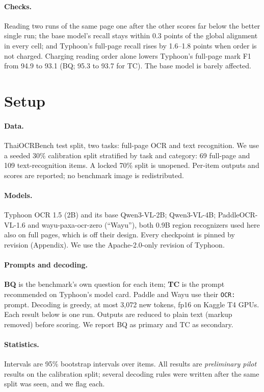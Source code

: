 \documentclass[10pt,twocolumn]{article}
\newcommand{\code}[1]{\texttt{#1}}
\begin{document}
\paragraph{Checks.} Reading two runs of the same page one after the other scores far below the better single run; the base model's recall stays within 0.3 points of the global alignment in every cell; and Typhoon's full-page recall rises by 1.6--1.8 points when order is not charged. Charging reading order alone lowers Typhoon's full-page mark F1 from 94.9 to 93.1 (BQ; 95.3 to 93.7 for TC). The base model is barely affected.

\section{Setup}\label{sec:setup}
\paragraph{Data.} ThaiOCRBench \citep{nonesung2025thaiocrbench} test split, two tasks: full-page OCR and text recognition. We use a seeded 30\% calibration split stratified by task and category: 69 full-page and 109 text-recognition items. A locked 70\% split is unopened. Per-item outputs and scores are reported; no benchmark image is redistributed.

\paragraph{Models.} Typhoon OCR 1.5 (2B) and its base Qwen3-VL-2B; Qwen3-VL-4B; PaddleOCR-VL-1.6 and wayu-paxa-ocr-zero (``Wayu''), both 0.9B region recognizers used here also on full pages, which is off their design. Every checkpoint is pinned by revision (Appendix). We use the Apache-2.0-only revision of Typhoon.

\paragraph{Prompts and decoding.} \textbf{BQ} is the benchmark's own question for each item; \textbf{TC} is the prompt recommended on Typhoon's model card. Paddle and Wayu use their \code{OCR:} prompt. Decoding is greedy, at most 3,072 new tokens, fp16 on Kaggle T4 GPUs. Each result below is one run. Outputs are reduced to plain text (markup removed) before scoring. We report BQ as primary and TC as secondary.

\paragraph{Statistics.} Intervals are 95\% bootstrap intervals over items. All results are \emph{preliminary pilot} results on the calibration split; several decoding rules were written after the same split was seen, and we flag each.
\end{document}
